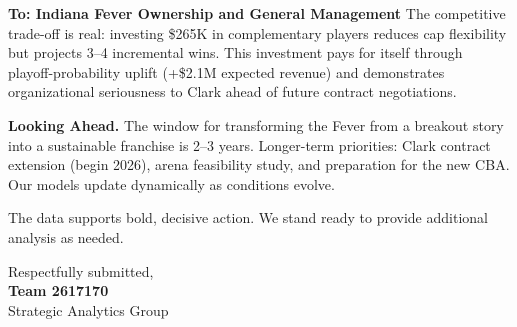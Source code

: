 \documentclass{mcmthesis}
\begin{document}
\begin{letter}{\textbf{To: Indiana Fever Ownership and General Management}}
The competitive trade-off is real: investing \$265K in complementary players reduces cap flexibility but projects 3--4 incremental wins. This investment pays for itself through playoff-probability uplift (+\$2.1M expected revenue) and demonstrates organizational seriousness to Clark ahead of future contract negotiations.

\vspace{0.15cm}
\noindent\textbf{Looking Ahead.} The window for transforming the Fever from a breakout story into a sustainable franchise is 2--3 years. Longer-term priorities: Clark contract extension (begin 2026), arena feasibility study, and preparation for the new CBA. Our models update dynamically as conditions evolve.

\vspace{0.15cm}
\noindent The data supports bold, decisive action. We stand ready to provide additional analysis as needed.

\vspace{0.4cm}
\noindent Respectfully submitted,\\[0.2cm]
\textbf{Team 2617170}\\
Strategic Analytics Group

\end{letter}

\newpage
\end{document}
